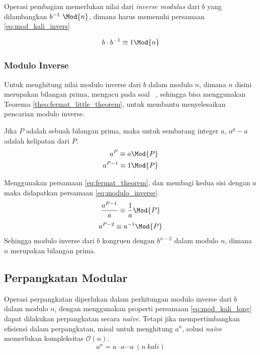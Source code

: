 \begin{enumerate}
	Operasi pembagian memerlukan nilai dari \textit{inverse modulus} dari $ b $ yang dilambangkan $ b^{-1}\ \Mod{n} $, dimana harus memenuhi persamaan \eqref{eq:mod_kali_invers}

	\begin{equation}
		b \cdot b^{-1} \equiv 1 \Mod{n}
		\label{eq:mod_kali_invers}
	\end{equation}

\end{enumerate}

\subsubsection{ Modulo Inverse}
Untuk menghitung nilai modulo inverse dari $ b $ dalam modulo $ n $, dimana $ n $ disini merupakan bilangan prima, mengacu pada soal \nomorsoal\ \soal, sehingga bisa menggunakan Teorema \ref{theo:fermat_little_theorem}, untuk membantu menyelesaikan pencarian modulo inverse.

\begin{theo}
	\label{theo:fermat_little_theorem}
	Jika $ P $ adalah sebuah bilangan prima, maka untuk sembarang integer $ a $, $ a^p - a $ adalah kelipatan dari $ P $.
	\begin{equation}
		\begin{aligned}
			a^{P} \equiv a \Mod{P} \\
			a^{P-1} \equiv 1 \Mod{P} \\
		\end{aligned}
		\label{eq:fermat_theorem}
	\end{equation}
\end{theo}
Menggunakan persamaan \eqref{eq:fermat_theorem}, dan membagi kedua sisi dengan $ a $ maka didapatkan persamaan \eqref{eq:modulo_inverse}.
$$ \frac{a^{P-1}}{a} \equiv \frac{1}{a} \Mod{P} \\ $$
\begin{equation}
	a^{P-2} \equiv a^{-1} \Mod{P} \\
	\label{eq:modulo_inverse}
\end{equation}
Sehingga modulo inverse dari $ b $ kongruen dengan $ b^{n-2} $ dalam modulo $ n $, dimana $ n $ merupakan bilangan prima.

\subsection{ Perpangkatan Modular}
Operasi perpangkatan diperlukan dalam perhitungan modulo inverse dari $ b $ dalam modulo $ n $, dengan menggunakan properti persamaan \eqref{eq:mod_kali_long} dapat dilakukan perpangkatan secara \textit{na\"ive}. Tetapi jika mempertimbangkan efisiensi dalam perpangkatan, misal untuk menghitung $ a^n $, solusi \textit{na\"ive} memerlukan kompleksitas $ \mathcal{O}{(n)} $.
$$ a^n = a \cdot a \cdots a\ (n\ kali) $$

